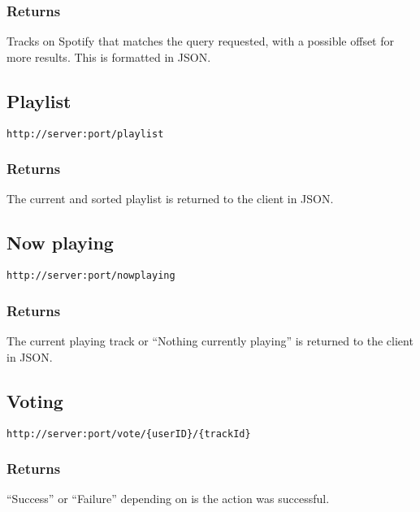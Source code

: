 \subsubsection{Returns}
Tracks on Spotify that matches the query requested, with a possible offset for more results. This is formatted in JSON.

\subsection{Playlist}

\begin{lstlisting}[label={lst:endpoint_playlist}, caption={Text surrounded by curly brackets are parameters.}]
http://server:port/playlist
\end{lstlisting}

\subsubsection{Returns}
The current and sorted playlist is returned to the client in JSON.

\subsection{Now playing}

\begin{lstlisting}[label={lst:endpoint_nowplaying}, caption={Text surrounded by curly brackets are parameters.}]
http://server:port/nowplaying
\end{lstlisting}

\subsubsection{Returns}
The current playing track or \enquote{Nothing currently playing} is returned to the client in JSON.

\subsection{Voting}

\begin{lstlisting}[label={lst:endpoint_vote}, caption={Text surrounded by curly brackets are parameters.}]
http://server:port/vote/{userID}/{trackId}
\end{lstlisting}

\subsubsection{Returns}
\enquote{Success} or \enquote{Failure} depending on is the action was successful.

